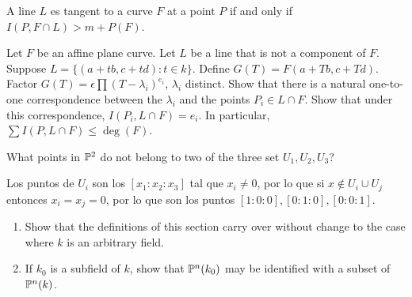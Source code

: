 \begin{sol}{3.15}

\end{sol}

\begin{prob}{3.19}
    A line \(L\) es tangent to a curve \(F\) at a point \(P\) if and only if \(I(P,F\cap L)>m+P(F)\).
\end{prob}

\begin{sol}{3.19}

\end{sol}

\begin{prob}{3.21}
    Let \(F\) be an affine plane curve. Let \(L\) be a line that is not a component of \(F\). Suppose \(L=\{(a+tb,c+td):t\in k\}\). Define \(G(T)=F(a+Tb,c+Td)\). Factor \(G(T)=\epsilon\prod(T-\lambda_i)^{e_i}\), \(\lambda_i\) distinct. Show that there is a natural one-to-one correspondence between the \(\lambda_i\) and the points \(P_i\in L\cap F\). Show that under this correspondence, \(I(P_i,L\cap F)=e_i\). In particular, \(\sum I(P,L\cap F)\leq\deg(F)\).
\end{prob}

\begin{sol}{3.21}

\end{sol}

\begin{prob}{4.1}
    What points in \(\mathbb{P}^2\) do not belong to two of the three set \(U_1,U_2,U_3\)?
\end{prob}

\begin{sol}{4.1}
    Los puntos de \(U_i\) son los \([x_1:x_2:x_3]\) tal que \(x_i\neq 0\), por lo que si \(x\notin U_i\cup U_j\) entonces \(x_i=x_j=0\), por lo que son los puntos \([1:0:0],[0:1:0],[0:0:1]\).
\end{sol}

\begin{prob}{4.3}
    \begin{enumerate}
        \item Show that the definitions of this section carry over without change to the case where \(k\) is an arbitrary field.
        \item If \(k_0\) is a subfield of \(k\), show that \(\mathbb{P}^n(k_0)\) may be identified with a subset of \(\mathbb{P}^n(k)\).
    \end{enumerate}
\end{prob}

